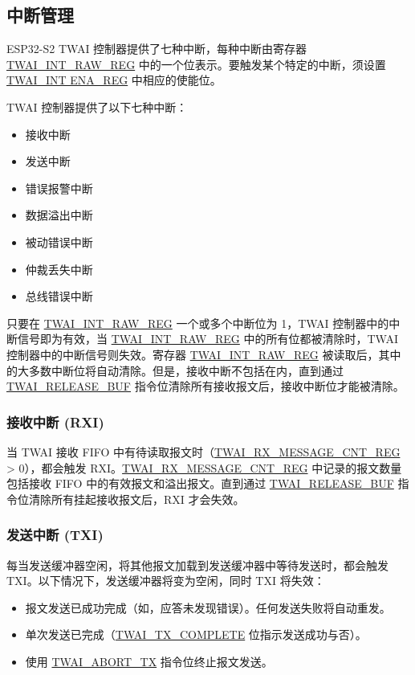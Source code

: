 \documentclass[main\_\_CN.tex]{subfiles}
\begin{document}
\subsection{中断管理}
\label{subsubsec:interrupt-management}
ESP32-S2 TWAI 控制器提供了七种中断，每种中断由寄存器 \hyperref[regdesc:TWAIINTRAWREG]{TWAI\_INT\_RAW\_REG} 中的一个位表示。要触发某个特定的中断，须设置 \hyperref[regdesc:TWAIINT ENAREG]{TWAI\_INT ENA\_REG} 中相应的使能位。

TWAI 控制器提供了以下七种中断：

\begin{itemize}
    \item 接收中断
    \item 发送中断
    \item 错误报警中断
    \item 数据溢出中断
    \item 被动错误中断
    \item 仲裁丢失中断
    \item 总线错误中断
\end{itemize}

只要在 \hyperref[regdesc:TWAIINTRAWREG]{TWAI\_INT\_RAW\_REG} 一个或多个中断位为 1，TWAI 控制器中的中断信号即为有效，当 \hyperref[regdesc:TWAIINTRAWREG]{TWAI\_INT\_RAW\_REG} 中的所有位都被清除时，TWAI 控制器中的中断信号则失效。寄存器 \hyperref[regdesc:TWAIINTRAWREG]{TWAI\_INT\_RAW\_REG} 被读取后，其中的大多数中断位将自动清除。但是，接收中断不包括在内，直到通过 \hyperref[fielddesc:TWAIRELEASEBUF]{TWAI\_RELEASE\_BUF} 指令位清除所有接收报文后，接收中断位才能被清除。

\subsubsection{接收中断 (RXI)}
当 TWAI 接收 FIFO 中有待读取报文时（\hyperref[regdesc:TWAIRXMESSAGECNTREG]{TWAI\_RX\_MESSAGE\_CNT\_REG} > 0），都会触发 RXI。\hyperref[regdesc:TWAIRXMESSAGECNTREG]{TWAI\_RX\_MESSAGE\_CNT\_REG} 中记录的报文数量包括接收 FIFO 中的有效报文和溢出报文。直到通过 \hyperref[fielddesc:TWAIRELEASEBUF]{TWAI\_RELEASE\_BUF} 指令位清除所有挂起接收报文后，RXI 才会失效。

\subsubsection{发送中断 (TXI)}
每当发送缓冲器空闲，将其他报文加载到发送缓冲器中等待发送时，都会触发 TXI。以下情况下，发送缓冲器将变为空闲，同时 TXI 将失效：

\begin{itemize}
    \item 报文发送已成功完成（如，应答未发现错误）。任何发送失败将自动重发。
    \item 单次发送已完成（\hyperref[fielddesc:TWAITXCOMPLETE]{TWAI\_TX\_COMPLETE} 位指示发送成功与否）。
    \item 使用 \hyperref[fielddesc:TWAIABORTTX]{TWAI\_ABORT\_TX} 指令位终止报文发送。
\end{itemize}
\end{document}
